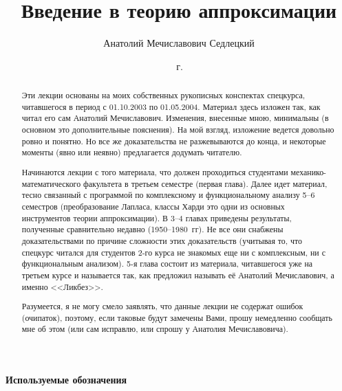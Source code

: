 \documentclass[a4paper]{article}
\begin{document}
\title {Введение в теорию аппроксимации}
\author{Анатолий Мечиславович Седлецкий}
\date{\,г.}
\maketitle

\centerline{}

\renewcommand{\abstractname}{Предисловие}
\begin{abstract}

Эти лекции основаны на моих собственных рукописных конспектах спецкурса, читавшегося в период с 01.10.2003 по
01.05.2004. Материал здесь изложен так, как читал его сам Анатолий Мечиславович. Изменения, внесенные мною,
минимальны (в основном это дополнительные пояснения). На мой взгляд, изложение ведется довольно ровно и
понятно. Но все же доказательства не разжевываются до конца, и некоторые моменты (явно или неявно)
предлагается додумать читателю.

Начинаются лекции с того материала, что должен проходиться студентами
механико-математического факультета в третьем семестре (первая глава). Далее идет материал, тесно связанный с
программой по комплексному и функциональному анализу 5--6 семестров (преобразование Лапласа, классы Харди\т
это одни из основных инструментов теории аппроксимации). В 3--4 главах приведены результаты, полученные
сравнительно недавно (1950--1980~гг). Не все они снабжены доказательствами по причине сложности этих
доказательств (учитывая то, что спецкурс читался для студентов 2-го курса не знакомых еще ни с комплексным, ни
с функциональным анализом). 5-я глава состоит из материала, читавшегося уже на третьем курсе и называется
так, как предложил называть её Анатолий Мечиславович, а именно <<Ликбез>>.

Разумеется, я не могу смело
заявлять, что данные лекции не содержат ошибок (очипаток), поэтому, если таковые будут замечены Вами, прошу
немедленно сообщать мне об этом (или сам исправлю, или спрошу у Анатолия Мечиславовича).

\end{abstract}




\begin{center}
\textbf{Используемые обозначения}
\end{center}
\end{document}
